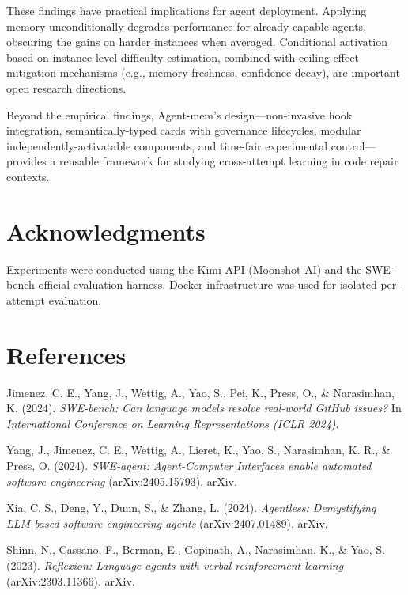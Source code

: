 \documentclass{article}
\begin{document}
These findings have practical implications for agent deployment. Applying memory unconditionally degrades performance for already-capable agents, obscuring the gains on harder instances when averaged. Conditional activation based on instance-level difficulty estimation, combined with ceiling-effect mitigation mechanisms (e.g., memory freshness, confidence decay), are important open research directions.

Beyond the empirical findings, Agent-mem's design---non-invasive hook integration, semantically-typed cards with governance lifecycles, modular independently-activatable components, and time-fair experimental control---provides a reusable framework for studying cross-attempt learning in code repair contexts.

\section*{Acknowledgments}

Experiments were conducted using the Kimi API (Moonshot AI) and the SWE-bench official evaluation harness. Docker infrastructure was used for isolated per-attempt evaluation.

\section{References}

Jimenez, C. E., Yang, J., Wettig, A., Yao, S., Pei, K., Press, O., \& Narasimhan, K. (2024). \textit{SWE-bench: Can language models resolve real-world GitHub issues?} In \textit{International Conference on Learning Representations (ICLR 2024)}.

Yang, J., Jimenez, C. E., Wettig, A., Lieret, K., Yao, S., Narasimhan, K. R., \& Press, O. (2024). \textit{SWE-agent: Agent-Computer Interfaces enable automated software engineering} (arXiv:2405.15793). arXiv.

Xia, C. S., Deng, Y., Dunn, S., \& Zhang, L. (2024). \textit{Agentless: Demystifying LLM-based software engineering agents} (arXiv:2407.01489). arXiv.

Shinn, N., Cassano, F., Berman, E., Gopinath, A., Narasimhan, K., \& Yao, S. (2023). \textit{Reflexion: Language agents with verbal reinforcement learning} (arXiv:2303.11366). arXiv.
\end{document}

